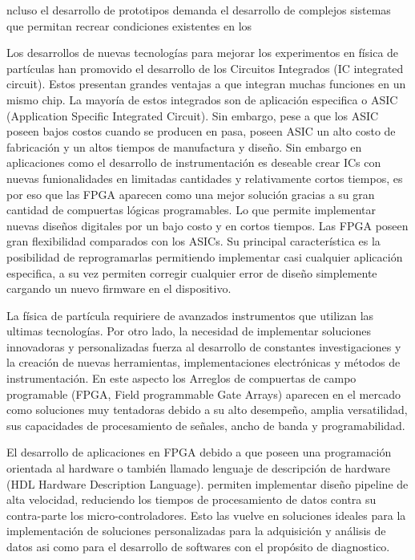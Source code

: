 ncluso el desarrollo de prototipos demanda el desarrollo de complejos sistemas que permitan recrear condiciones existentes en los 







 Los desarrollos de nuevas tecnologías para mejorar los experimentos en física de partículas han promovido el desarrollo de los Circuitos Integrados (IC integrated circuit). Estos presentan grandes ventajas a que integran muchas funciones en un mismo chip. La mayoría de estos integrados son de aplicación especifica o ASIC (Application Specific Integrated Circuit). Sin embargo, pese a que los ASIC poseen bajos costos cuando se producen en pasa, poseen  ASIC un alto costo de fabricación  y un altos tiempos de manufactura y diseño. 
Sin embargo en aplicaciones como el desarrollo de instrumentación es deseable crear ICs con nuevas funionalidades en limitadas cantidades y relativamente cortos tiempos, es por eso que las FPGA aparecen como una mejor solución gracias a su gran cantidad de compuertas lógicas programables. Lo que permite implementar nuevas diseños digitales por un bajo costo y en cortos tiempos. 
Las FPGA poseen gran flexibilidad comparados con los ASICs. Su principal característica es la posibilidad de reprogramarlas permitiendo implementar casi cualquier aplicación especifica, a su vez permiten corregir cualquier error de diseño simplemente cargando un nuevo firmware en el dispositivo.










La física de partícula requiriere de avanzados instrumentos que utilizan las ultimas tecnologías. Por otro lado, la necesidad de implementar soluciones innovadoras y personalizadas fuerza al desarrollo de constantes investigaciones y la creación de nuevas herramientas, implementaciones electrónicas y métodos de instrumentación.
En este aspecto los Arreglos de compuertas de campo programable (FPGA, Field programmable Gate Arrays) aparecen en el mercado como soluciones muy tentadoras debido a su alto desempeño, amplia versatilidad, sus capacidades de procesamiento de señales, ancho de banda y programabilidad. 







El desarrollo de aplicaciones en FPGA debido a que poseen una programación orientada al hardware o también llamado lenguaje de descripción de hardware (HDL Hardware Description Language). permiten implementar diseño pipeline de alta velocidad, reduciendo los tiempos de procesamiento de datos contra su contra-parte los micro-controladores. Esto las vuelve en soluciones ideales para la implementación  de soluciones personalizadas para la adquisición y  análisis  de datos asi como para el desarrollo de softwares con el propósito de diagnostico.
 
